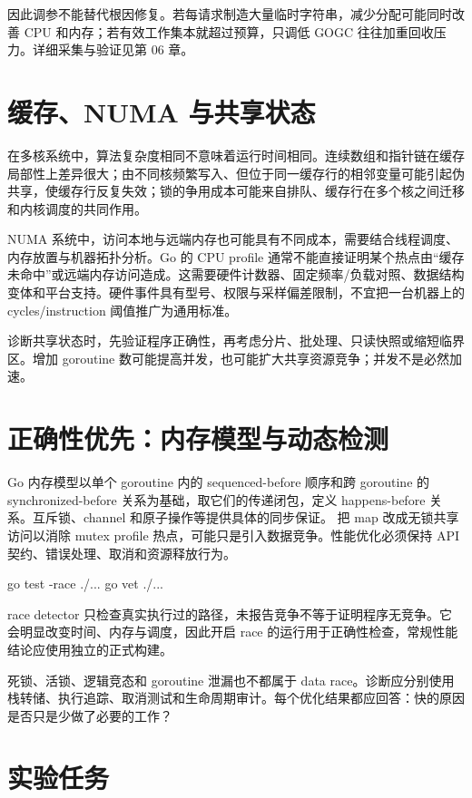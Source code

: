 \documentclass[UTF8,fontset=fandol,openany,11pt]{ctexbook}
\begin{document}
因此调参不能替代根因修复。若每请求制造大量临时字符串，减少分配可能同时改善 CPU 和内存；若有效工作集本就超过预算，只调低 GOGC 往往加重回收压力。详细采集与验证见第 06 章。

\section{缓存、NUMA 与共享状态}
在多核系统中，算法复杂度相同不意味着运行时间相同。连续数组和指针链在缓存局部性上差异很大；由不同核频繁写入、但位于同一缓存行的相邻变量可能引起伪共享，使缓存行反复失效；锁的争用成本可能来自排队、缓存行在多个核之间迁移和内核调度的共同作用。

NUMA 系统中，访问本地与远端内存也可能具有不同成本，需要结合线程调度、内存放置与机器拓扑分析。Go 的 CPU profile 通常不能直接证明某个热点由“缓存未命中”或远端内存访问造成。这需要硬件计数器、固定频率/负载对照、数据结构变体和平台支持。硬件事件具有型号、权限与采样偏差限制，不宜把一台机器上的 cycles/instruction 阈值推广为通用标准。

诊断共享状态时，先验证程序正确性，再考虑分片、批处理、只读快照或缩短临界区。增加 goroutine 数可能提高并发，也可能扩大共享资源竞争；并发不是必然加速。

\section{正确性优先：内存模型与动态检测}
Go 内存模型以单个 goroutine 内的 sequenced-before 顺序和跨 goroutine 的 synchronized-before 关系为基础，取它们的传递闭包，定义 happens-before 关系。互斥锁、channel 和原子操作等提供具体的同步保证。\cite{go-model} 把 map 改成无锁共享访问以消除 mutex profile 热点，可能只是引入数据竞争。性能优化必须保持 API 契约、错误处理、取消和资源释放行为。

\begin{codeblock}
go test -race ./...
go vet ./...
\end{codeblock}

race detector 只检查真实执行过的路径，未报告竞争不等于证明程序无竞争。它会明显改变时间、内存与调度，因此开启 race 的运行用于正确性检查，常规性能结论应使用独立的正式构建。\cite{go-race}

死锁、活锁、逻辑竞态和 goroutine 泄漏也不都属于 data race。诊断应分别使用栈转储、执行追踪、取消测试和生命周期审计。每个优化结果都应回答：快的原因是否只是少做了必要的工作？

\section{实验任务}
\end{document}
